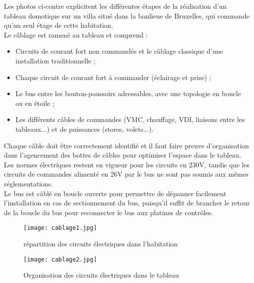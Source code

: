\documentclass[a4paper, 12pt]{article}
\begin{document}
Les photos ci-contre explicitent les différentes étapes de la réalisation d’un tableau domotique sur un villa situé dans la banlieue de Bruxelles, qui commande qu’un seul étage de cette habitation.\\
Le câblage est ramené au tableau et comprend :

\begin{itemize} 
  \item Circuits de courant fort non commandés et le câblage classique d'une installation traditionnelle ;
  \item Chaque circuit de courant fort à commander (éclairage et prise) ;
  \item Le bus entre les bouton-poussoirs adressables, avec une topologie en boucle ou en étoile ;
  \item Les différents câbles de commandes (VMC, chauffage, VDI, liaisons entre les tableaux...) et de puissances (stores, volets...).
\end{itemize}

Chaque câble doit être correctement identifié et il faut faire preuve d’organisation dans l’agencement des bottes de câbles pour optimiser l’espace dans le tableau. Les normes électriques restent en vigueur pour les circuits en 230V, tandis que les circuits de commandes alimenté en 26V par le bus ne sont pas soumis aux mêmes réglementations.\\Le bus est câblé en boucle ouverte pour permettre de dépanner facilement l’installation en cas de sectionnement du bus, puisqu’il suffit de brancher le retour de la boucle du bus pour reconnecter le bus aux platines de contrôles.\\

\begin{figure}[h]
    \begin{minipage}[t]{.46\linewidth}
        \centering
        \texttt{[image: cablage1.jpg]}
        \caption{répartition des circuits électriques dans l'habitation}
    \end{minipage}
    \hfill
    \begin{minipage}[t]{.46\linewidth}
        \centering
        \texttt{[image: cablage2.jpg]}
        \caption{Organisation des circuits électriques dans le tableau}
    \end{minipage}
\end{figure}
\end{document}
